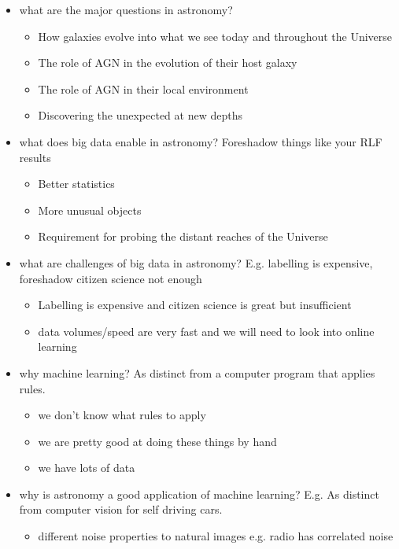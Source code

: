 \begin{itemize}
    \item what are the major questions in astronomy? \begin{itemize}
            \item How galaxies evolve into what we see today and throughout the Universe
            \item The role of AGN in the evolution of their host galaxy
            \item The role of AGN in their local environment
            \item Discovering the unexpected at new depths
        \end{itemize}
    \item what does big data enable in astronomy? Foreshadow things like your RLF results \begin{itemize}
            \item Better statistics
            \item More unusual objects
            \item Requirement for probing the distant reaches of the Universe
        \end{itemize}
    \item what are challenges of big data in astronomy? E.g. labelling is expensive, foreshadow citizen science not enough \begin{itemize}
        \item Labelling is expensive and citizen science is great but insufficient
        \item data volumes/speed are very fast and we will need to look into online learning
    \end{itemize}
    \item why machine learning? As distinct from a computer program that applies rules. \begin{itemize}
        \item we don't know what rules to apply
        \item we are pretty good at doing these things by hand
        \item we have lots of data
    \end{itemize}
    \item why is astronomy a good application of machine learning? E.g. As distinct from computer vision for self driving cars. \begin{itemize}
        \item different noise properties to natural images e.g. radio has correlated noise

\end{itemize}
\end{itemize}
